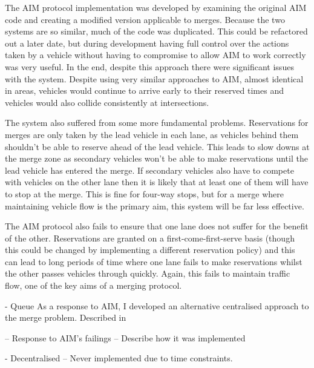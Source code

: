 The AIM protocol implementation was developed by examining the original AIM code and creating a modified version applicable to merges. Because the two systems are so similar, much of the code was duplicated. This could be refactored out a later date, but during development having full control over the actions taken by a vehicle without having to compromise to allow AIM to work correctly was very useful. In the end, despite this approach there were significant issues with the system. Despite using very similar approaches to AIM, almost identical in areas, vehicles would continue to arrive early to their reserved times and vehicles would also collide consistently at intersections.

The system also suffered from some more fundamental problems. Reservations for merges are only taken by the lead vehicle in each lane, as vehicles behind them shouldn't be able to reserve ahead of the lead vehicle. This leads to slow downs at the merge zone as secondary vehicles won't be able to make reservations until the lead vehicle has entered the merge. If secondary vehicles also have to compete with vehicles on the other lane then it is likely that at least one of them will have to stop at the merge. This is fine for four-way stops, but for a merge where maintaining vehicle flow is the primary aim, this system will be far less effective.

The AIM protocol also fails to ensure that one lane does not suffer for the benefit of the other. Reservations are granted on a first-come-first-serve basis (though this could be changed by implementing a different reservation policy) and this can lead to long periods of time where one lane fails to make reservations whilst the other passes vehicles through quickly. Again, this fails to maintain traffic flow, one of the key aims of a merging protocol.

- Queue
As a response to AIM, I developed an alternative centralised approach to the merge problem. Described in 

-- Response to AIM's failings
-- Describe how it was implemented

- Decentralised
-- Never implemented due to time constraints.


